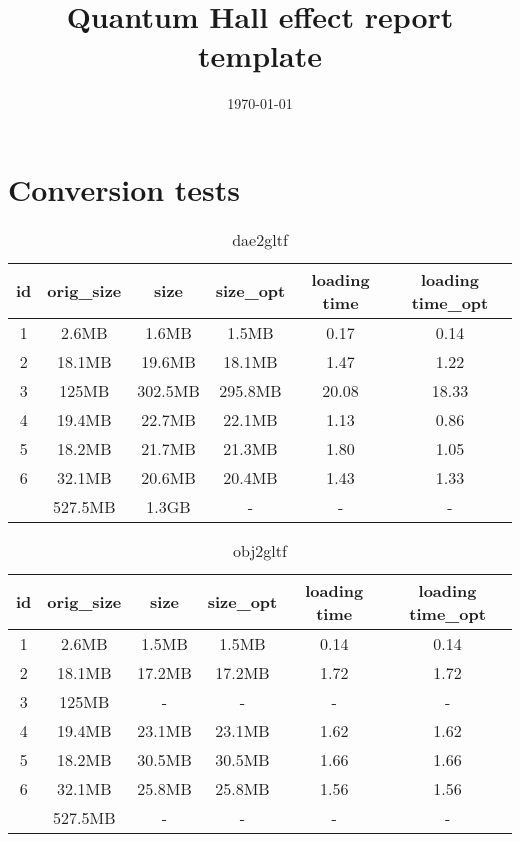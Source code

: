 \documentclass[a4paper]{article}
\title{Quantum Hall effect report template}
\date{\today}
\begin{document}
\section*{Conversion tests}

\begin{table}[h]
\begin{tabular}{cccccc}
id & orig\_size & size & size\_opt & loading time & loading time\_opt \\ \hline
1  & 2.6MB & 1.6MB& 1.5MB     & 0.17 & 0.14                   \\
2  & 18.1MB & 19.6MB& 18.1MB  &  1.47 & 1.22                   \\
3  & 125MB & 302.5MB & 295.8MB &  20.08 & 18.33                  \\
4  & 19.4MB & 22.7MB &  22.1MB & 1.13 & 0.86 \\
5  & 18.2MB & 21.7MB & 21.3MB & 1.80 & 1.05                  \\
6  & 32.1MB & 20.6MB & 20.4MB & 1.43 & 1.33              \\  \hdashline
1  & 527.5MB & 1.3GB & - & - & -                 
\end{tabular}
\caption{dae2gltf}
\end{table}

\begin{table}[h]
\begin{tabular}{cccccc}
id & orig\_size & size & size\_opt & loading time & loading time\_opt \\ \hline
1  & 2.6MB & 1.5MB& 1.5MB     & 0.14              & 0.14                  \\
2  & 18.1MB & 17.2MB& 17.2MB  & 1.72              & 1.72                  \\
3  & 125MB & - & - &       -       &         -          \\
4  & 19.4MB & 23.1MB &  23.1MB & 1.62                 & 1.62  \\
5  & 18.2MB & 30.5MB & 30.5MB & 1.66             & 1.66                  \\
6  & 32.1MB & 25.8MB & 25.8MB & 1.56             &    1.56 \\ \hdashline
1  & 527.5MB & - & - & - & -                
\end{tabular}
\caption{obj2gltf}
\end{table}
\end{document}

